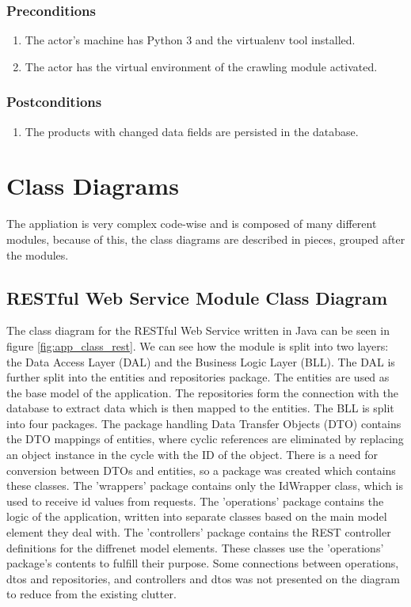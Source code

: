 \documentclass[12pt,a4paper,twoside]{report}
\begin{document}
\subsubsection{Preconditions}

\begin{enumerate}
  \item The actor's machine has Python 3 and the virtualenv tool installed.
  \item The actor has the virtual environment of the crawling module activated.
\end{enumerate}


\subsubsection{Postconditions}

\begin{enumerate}
  \item The products with changed data fields are persisted in the database.
\end{enumerate}


\section{Class Diagrams}

The appliation is very complex code-wise and is composed of many different modules, because of this, the class diagrams are described in pieces, grouped after the modules.


\subsection{RESTful Web Service Module Class Diagram}

The class diagram for the RESTful Web Service written in Java can be seen in figure \ref{fig:app_class_rest}. We can see how the module is split into two layers: the Data Access Layer (DAL) and the Business Logic Layer (BLL). The DAL is further split into the entities and repositories package. The entities are used as the base model of the application. The repositories form the connection with the database to extract data which is then mapped to the entities. The BLL is split into four packages. The package handling Data Transfer Objects (DTO) contains the DTO mappings of entities, where cyclic references are eliminated by replacing an object instance in the cycle with the ID of the object. There is a need for conversion between DTOs and entities, so a package was created which contains these classes. The 'wrappers' package contains only the IdWrapper class, which is used to receive id values from requests. The 'operations' package contains the logic of the application, written into separate classes based on the main model element they deal with. The 'controllers' package contains the REST controller definitions for the diffrenet model elements. These classes use the 'operations' package's contents to fulfill their purpose. Some connections between operations, dtos and repositories, and controllers and dtos was not presented on the diagram to reduce from the existing clutter.
\end{document}
